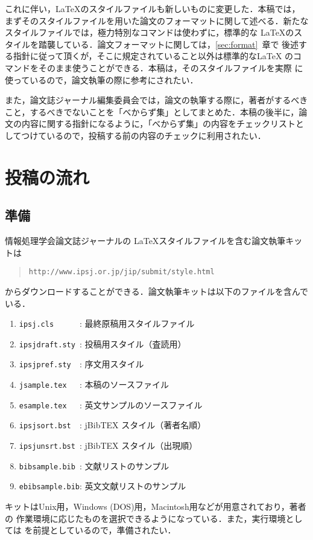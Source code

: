 \documentclass[submit,techrep]{ipsj}
\def\|{\verb|}
\begin{document}
これに伴い，\LaTeX のスタイルファイルも新しいものに変更した．本稿では，
まずそのスタイルファイルを用いた論文のフォーマットに関して述べる．新たな
スタイルファイルでは，極力特別なコマンドは使わずに，標準的な \LaTeX のス
タイルを踏襲している．論文フォーマットに関しては，\ref{sec:format}~章で
後述する指針に従って頂くが，そこに規定されていること以外は標準的な\LaTeX 
のコマンドをそのまま使うことができる．本稿は，そのスタイルファイルを実際
に使っているので，論文執筆の際に参考にされたい．



また，論文誌ジャーナル編集委員会では，論文の執筆する際に，著者がするべき
こと，するべきでないことを「べからず集」としてまとめた．本稿の後半に，論
文の内容に関する指針になるように，「べからず集」の内容をチェックリストと
してつけているので，投稿する前の内容のチェックに利用されたい．

%2
\section{投稿の流れ}

%2.1
\subsection{準備}

情報処理学会論文誌ジャーナルの \LaTeX スタイルファイルを含む論文執筆キッ
トは
\begin{quote}
\small
\|http://www.ipsj.or.jp/jip/submit/style.html|
\end{quote}
からダウンロードすることができる．論文執筆キットは以下のファイルを含んで
いる．
\begin{enumerate}
\item \|ipsj.cls      |: 最終原稿用スタイルファイル
\item \|ipsjdraft.sty |: 投稿用スタイル（査読用）
\item \|ipsjpref.sty  |: 序文用スタイル
\item \|jsample.tex   |: 本稿のソースファイル
\item \|esample.tex   |: 英文サンプルのソースファイル
\item \|ipsjsort.bst  |: jBibTEX スタイル（著者名順）
\item \|ipsjunsrt.bst |: jBibTEX スタイル（出現順）
\item \|bibsample.bib |: 文献リストのサンプル
\item \|ebibsample.bib|: 英文文献リストのサンプル
\end{enumerate}
キットはUnix用，Windows (DOS)用，Macintosh用などが用意されており，著者の
作業環境に応じたものを選択できるようになっている．また，実行環境としては 
\LaTeXe を前提としているので，準備されたい．
\end{document}
